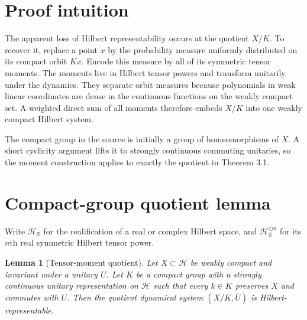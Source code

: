\documentclass[11pt]{article}
\newtheorem{lemma}{Lemma}
\newcommand{\R}{\mathbb R}
\newcommand{\Hh}{\mathcal H}
\begin{document}
\section*{Proof intuition}

The apparent loss of Hilbert representability occurs at the quotient $X/K$.
To recover it, replace a point $x$ by the probability measure uniformly
distributed on its compact orbit $Kx$.  Encode this measure by all of its
symmetric tensor moments.  The moments live in Hilbert tensor powers and
transform unitarily under the dynamics.  They separate orbit measures because
polynomials in weak linear coordinates are dense in the continuous functions
on the weakly compact set.  A weighted direct sum of all moments therefore
embeds $X/K$ into one weakly compact Hilbert system.

The compact group in the source is initially a group of homeomorphisms of
$X$.  A short cyclicity argument lifts it to strongly continuous commuting
unitaries, so the moment construction applies to exactly the quotient in
Theorem 3.1.

\section*{Compact-group quotient lemma}

Write $\Hh_{\R}$ for the realification of a real or complex Hilbert space, and
$\Hh_{\R}^{\odot n}$ for its $n$th real symmetric Hilbert tensor power.

\begin{lemma}[Tensor-moment quotient]
Let $X\subset\Hh$ be weakly compact and invariant under a unitary $U$.  Let
$K$ be a compact group with a strongly continuous unitary representation on
$\Hh$ such that every $k\in K$ preserves $X$ and commutes with $U$.  Then the
quotient dynamical system $(X/K,\bar U)$ is Hilbert-representable.
\end{lemma}
\end{document}
